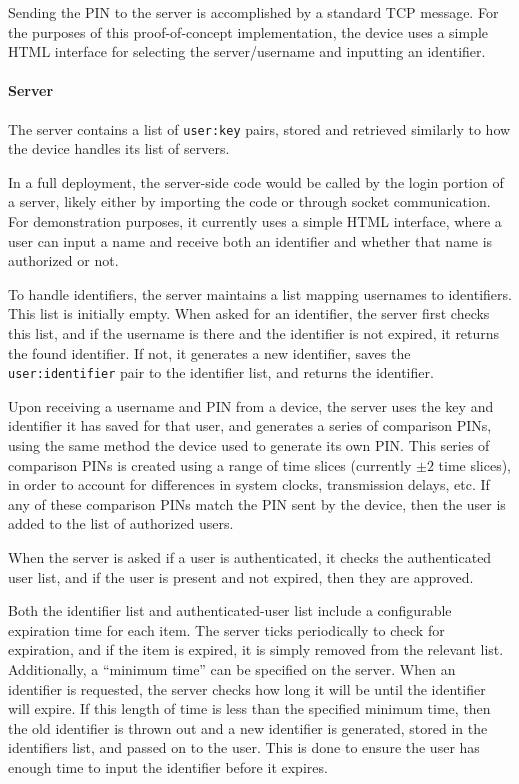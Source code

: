 \documentclass[11pt]{article} %
\begin{document}
Sending the PIN to the server is accomplished by a standard TCP message.
For the purposes of this proof-of-concept implementation, the device
uses a simple HTML interface for selecting the server/username and
inputting an identifier.



\paragraph{Server}
The server contains a list of \texttt{user:key} pairs, stored and
retrieved similarly to how the device handles its list of servers.

In a full deployment, the server-side code would be called by the login
portion of a server, likely either by importing the code or through
socket communication. For demonstration purposes, it currently uses a
simple HTML interface, where a user can input a name and receive both an
identifier and whether that name is authorized or not.

To handle identifiers, the server maintains a list mapping usernames to
identifiers. This list is initially empty. When asked for an identifier,
the server first checks this list, and if the username is there and the
identifier is not expired, it returns the found identifier. If not, it
generates a new identifier, saves the \texttt{user:identifier} pair to
the identifier list, and returns the identifier.

Upon receiving a username and PIN from a device, the server uses the key
and identifier it has saved for that user, and generates a series of
comparison PINs, using the same method the device used to generate its
own PIN. This series of comparison PINs is created using a range of time
slices (currently $\pm2$ time slices), in order to account for
differences in system clocks, transmission delays, etc. If any of these
comparison PINs match the PIN sent by the device, then the user is added
to the list of authorized users.

When the server is asked if a user is authenticated, it checks the
authenticated user list, and if the user is present and not expired,
then they are approved.

Both the identifier list and authenticated-user list include a
configurable expiration time for each item. The server ticks
periodically to check for expiration, and if the item is expired, it is
simply removed from the relevant list. Additionally, a ``minimum time''
can be specified on the server. When an identifier is requested, the
server checks how long it will be until the identifier will expire. If
this length of time is less than the specified minimum time, then the
old identifier is thrown out and a new identifier is generated, stored
in the identifiers list, and passed on to the user. This is done to
ensure the user has enough time to input the identifier before it
expires.
\end{document}
